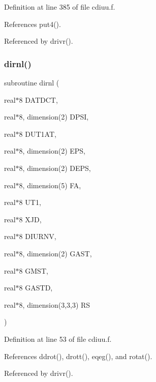 Definition at line 385 of file cdiuu.\+f.



References put4().



Referenced by drivr().

\mbox{\label{cdiuu_8f_af600fe33d7c5f30bef94ae042d07b5fa}} 
\subsubsection{\texorpdfstring{dirnl()}{dirnl()}}
{\footnotesize\ttfamily subroutine dirnl (\begin{DoxyParamCaption}\item[{real$\ast$8}]{D\+A\+T\+D\+CT,  }\item[{real$\ast$8, dimension(2)}]{D\+P\+SI,  }\item[{real$\ast$8}]{D\+U\+T1\+AT,  }\item[{real$\ast$8, dimension(2)}]{E\+PS,  }\item[{real$\ast$8, dimension(2)}]{D\+E\+PS,  }\item[{real$\ast$8, dimension(5)}]{FA,  }\item[{real$\ast$8}]{U\+T1,  }\item[{real$\ast$8}]{X\+JD,  }\item[{real$\ast$8}]{D\+I\+U\+R\+NV,  }\item[{real$\ast$8, dimension(2)}]{G\+A\+ST,  }\item[{real$\ast$8}]{G\+M\+ST,  }\item[{real$\ast$8}]{G\+A\+S\+TD,  }\item[{real$\ast$8, dimension(3,3,3)}]{RS }\end{DoxyParamCaption})}



Definition at line 53 of file cdiuu.\+f.



References ddrot(), drott(), eqeg(), and rotat().



Referenced by drivr().

\mbox{\label{cdiuu_8f_aa985762c7815110573474373be8645fb}} 
